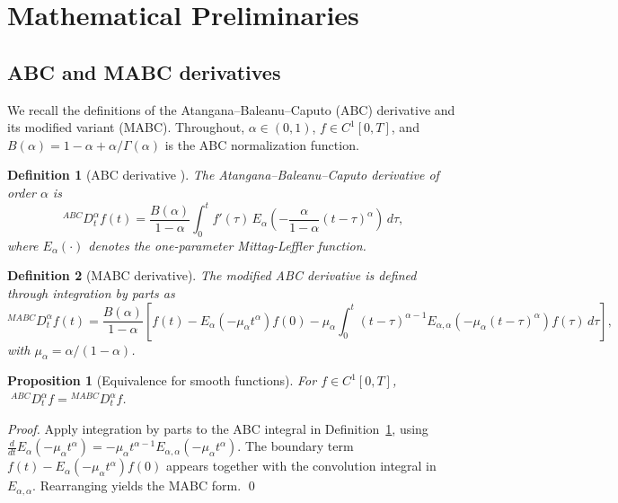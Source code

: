 \documentclass[11pt]{article}
\newtheorem{proposition}{Proposition}
\newtheorem{definition}{Definition}
\begin{document}
\section{Mathematical Preliminaries}
\label{sec:prelim}

\subsection{ABC and MABC derivatives}
\label{sec:abc}

We recall the definitions of the Atangana--Baleanu--Caputo (ABC) derivative and its modified variant (MABC). Throughout, \(\alpha \in (0,1)\), \(f \in C^1[0,T]\), and \(B(\alpha) = 1-\alpha+\alpha/\Gamma(\alpha)\) is the ABC normalization function.

\begin{definition}[ABC derivative \cite{Atangana2016}]
\label{def:abc}
The Atangana--Baleanu--Caputo derivative of order \(\alpha\) is
\begin{equation}
{}^{ABC}D_t^\alpha f(t)
=
\frac{B(\alpha)}{1-\alpha}
\int_0^t
f'(\tau)\,
E_\alpha\!\left(-\frac{\alpha}{1-\alpha}(t-\tau)^\alpha\right)
\,d\tau,
\end{equation}
where \(E_\alpha(\cdot)\) denotes the one-parameter Mittag-Leffler function.
\end{definition}

\begin{definition}[MABC derivative]
\label{def:mabc}
The modified ABC derivative is defined through integration by parts as
\begin{equation}
{}^{MABC}D_t^\alpha f(t)
=
\frac{B(\alpha)}{1-\alpha}
\!\left[
f(t) - E_\alpha(-\mu_\alpha t^\alpha) f(0)
- \mu_\alpha \!\int_0^t\! (t-\tau)^{\alpha-1} E_{\alpha,\alpha}(-\mu_\alpha(t-\tau)^\alpha) f(\tau)\,d\tau
\right],
\end{equation}
with \(\mu_\alpha = \alpha/(1-\alpha)\).
\end{definition}

\begin{proposition}[Equivalence for smooth functions]
\label{prop:equiv}
For \(f \in C^1[0,T]\), \(\;{}^{ABC}D_t^\alpha f = {}^{MABC}D_t^\alpha f\).
\end{proposition}

\begin{proof}
Apply integration by parts to the ABC integral in Definition~\ref{def:abc}, using
\(\frac{d}{dt}E_\alpha(-\mu_\alpha t^\alpha) = -\mu_\alpha t^{\alpha-1} E_{\alpha,\alpha}(-\mu_\alpha t^\alpha)\).
The boundary term \(f(t) - E_\alpha(-\mu_\alpha t^\alpha) f(0)\) appears together with the convolution integral in \(E_{\alpha,\alpha}\). Rearranging yields the MABC form. \qed
\end{proof}
\end{document}
